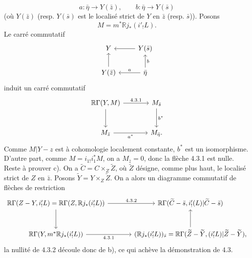 \documentclass[11pt]{article}
\newcommand{\R}{\mathbb{R}}\newcommand{\RHomCore}{\mathbb{R}\mathrm{Hom}}
\providecommand{\R}{\mathrm R}
\begin{document}
\[
a:\bar\eta\to Y(\bar z),\qquad b:\bar\eta\to Y(\bar s)
\]
(où $Y(\bar z)$ (resp. $Y(\bar s)$ est le localisé strict de $Y$ en $\bar z$ (resp. $\bar s$)). Posons
\[
M=m^*\R j_*(i'_!L).
\]
Le carré commutatif
\[
\begin{tikzcd}
Y & Y(\bar s)\arrow[l]\\
Y(\bar z)\arrow[u] & \bar\eta \arrow[l,"a"']\arrow[u,"b"']
\end{tikzcd}
\]
induit un carré commutatif
\[
\begin{tikzcd}[column sep=large,row sep=large]
\R\Gamma(Y,M) \arrow[r,"4.3.1"] \arrow[d] & M_{\bar s} \arrow[d,"b^*"]\\
M_{\bar z} \arrow[r,"a^*"'] & M_{\bar\eta}.
\end{tikzcd}
\]
Comme $M|Y-z$ est à cohomologie localement constante, $b^*$ est un isomorphisme. D'autre part, comme $M=i_{1!}i_1^*M$, on a $M_{\bar z}=0$, donc la flèche 4.3.1 est nulle. Reste à prouver c). On a $\widetilde C=C\times_Z\widetilde Z$, où $\widetilde Z$ désigne, comme plus haut, le localisé strict de $Z$ en $\bar z$. Posons $\widetilde Y=Y\times_Z\widetilde Z$. On a alors un diagramme commutatif de flèches de restriction
\[
\begin{tikzcd}[column sep=large,row sep=large]
\R\Gamma(Z-Y,i'_!L)=\R\Gamma(Z,\R j_*(i'_!L))
 \arrow[r,"4.3.2"] \arrow[d]
&
\R\Gamma(\widetilde C-\bar s,i'_!(L)|\widetilde C-\bar s)\\
\R\Gamma(Y,m^*\R j_*(i'_!L)) \arrow[r,"4.3.1"']
&
(\R j_*(i'_!L))_{\bar s}
  =\R\Gamma(\widetilde Z-\widetilde Y,(i'_!L)|\widetilde Z-\widetilde Y) , \arrow[u]
\end{tikzcd}
\]
la nullité de 4.3.2 découle donc de b), ce qui achève la démonstration de 4.3.
\end{document}
